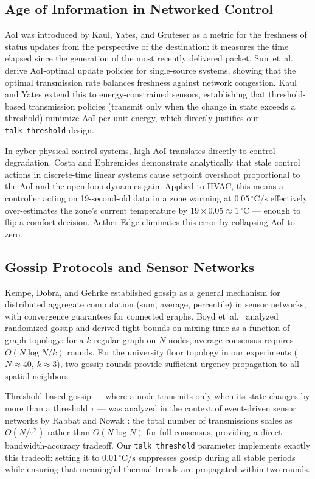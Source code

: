 \documentclass[conference]{IEEEtran}
\begin{document}
\subsection{Age of Information in Networked Control}

AoI was introduced by Kaul, Yates, and Gruteser \cite{kaul2012} as a metric
for the freshness of status updates from the perspective of the destination: it
measures the time elapsed since the generation of the most recently delivered
packet.  Sun~et~al.~\cite{sun2017} derive AoI-optimal update policies for
single-source systems, showing that the optimal transmission rate balances
freshness against network congestion.  Kaul and Yates \cite{kaul2020} extend
this to energy-constrained sensors, establishing that threshold-based
transmission policies (transmit only when the change in state exceeds a
threshold) minimize AoI per unit energy, which directly justifies our
\texttt{talk\_threshold} design.

In cyber-physical control systems, high AoI translates directly to control
degradation.  Costa and Ephremides \cite{costa2016} demonstrate analytically
that stale control actions in discrete-time linear systems cause setpoint
overshoot proportional to the AoI and the open-loop dynamics gain.  Applied
to HVAC, this means a controller acting on 19-second-old data in a zone
warming at $0.05\,^\circ\text{C/s}$ effectively over-estimates the zone's
current temperature by $19 \times 0.05 \approx 1\,^\circ\text{C}$ --- enough
to flip a comfort decision.  Aether-Edge eliminates this error by collapsing
AoI to zero.

\subsection{Gossip Protocols and Sensor Networks}

Kempe, Dobra, and Gehrke \cite{kempe2003} established gossip as a general
mechanism for distributed aggregate computation (sum, average, percentile)
in sensor networks, with convergence guarantees for connected graphs.  Boyd
et~al.~\cite{boyd2006} analyzed randomized gossip and derived tight bounds on
mixing time as a function of graph topology: for a $k$-regular graph on $N$
nodes, average consensus requires $O(N \log N / k)$ rounds.  For the
university floor topology in our experiments ($N \approx 40$, $k \approx 3$),
two gossip rounds provide sufficient urgency propagation to all spatial
neighbors.

Threshold-based gossip --- where a node transmits only when its state changes
by more than a threshold $\tau$ --- was analyzed in the context of event-driven
sensor networks by Rabbat and Nowak \cite{rabbat2004}: the total number of
transmissions scales as $O(N/\tau^2)$ rather than $O(N \log N)$ for full
consensus, providing a direct bandwidth-accuracy tradeoff.  Our
\texttt{talk\_threshold} parameter implements exactly this tradeoff: setting
it to $0.01\,^\circ\text{C/s}$ suppresses gossip during all stable periods
while ensuring that meaningful thermal trends are propagated within two rounds.
\end{document}
